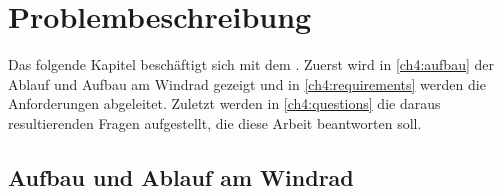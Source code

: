 \chapter{Problembeschreibung} \label{ch:problem}
Das folgende Kapitel beschäftigt sich mit dem .
Zuerst wird in \autoref{ch4:aufbau} der Ablauf und Aufbau am Windrad gezeigt und in \autoref{ch4:requirements} werden die Anforderungen abgeleitet.
Zuletzt werden in \autoref{ch4:questions} die daraus resultierenden Fragen aufgestellt, die diese Arbeit beantworten soll.

\section{Aufbau und Ablauf am Windrad}
\label{ch4:aufbau}

